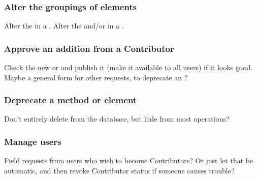 \subsubsection{Alter the groupings of elements}

Alter the \Elements in a \Refset.
Alter the \Elements and/or \Refsets in a \Benchmark.

\subsubsection{Approve an addition from a Contributor}

Check the new \Method or \Element and publish it (make it available to all users) if it looks good.
Maybe a general form for other requests, \eg to deprecate an \Element?

\subsubsection{Deprecate a method or element}

Don't entirely delete from the database, but hide from most operations?

\subsubsection{Manage users}

Field requests from users who wish to become Contributors?
Or just let that be automatic, and then revoke Contributor status if someone causes trouble?
